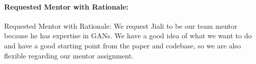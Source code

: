 \documentclass[11pt]{article}
\begin{document}
\paragraph{Requested Mentor with Rationale:} Requested Mentor with Rationale: We request Jiali to be our team mentor because he has expertise in GANs. We have a good idea of what we want to do and have a good starting point from the paper and codebase, so we are also flexible regarding our mentor assignment.

 
\end{document}
